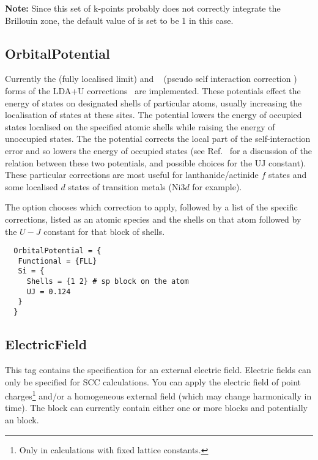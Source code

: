 \textbf{Note:} Since this set of k-points probably does not correctly integrate the Brillouin zone,
the default value of  is set to be 1 in this case.

\subsection{OrbitalPotential}
\label{sec:dftbp.OrbitalPotential}

\label{sec:DFTB+U}

Currently the  (fully localised limit) and
~\cite{hourahine07} (pseudo self interaction correction )
forms of the LDA+U corrections~\cite{petukhov-PRB-67-153106} are
implemented. These potentials effect the energy of states on
designated shells of particular atoms, usually increasing the
localisation of states at these sites. The  potential lowers
the energy of occupied states localised on the specified atomic shells
while raising the energy of unoccupied states. The the 
potential corrects the local part of the self-interaction error and so
lowers the energy of occupied states (see Ref.~\cite{hourahine07} for
a discussion of the relation between these two potentials, and
possible choices for the UJ constant).  These particular corrections
are most useful for lanthanide/actinide $f$ states and some localised
$d$ states of transition metals (Ni$3d$ for example).

The  option chooses which correction to apply, followed
by a list of the specific corrections, listed as an atomic species and
the shells on that atom followed by the $U-J$ constant for that block
of shells.

\begin{verbatim}
  OrbitalPotential = {
   Functional = {FLL}
   Si = {
     Shells = {1 2} # sp block on the atom
     UJ = 0.124
   }
  }
\end{verbatim}

\subsection{ElectricField}
\label{sec:dftbp.ElectricField}

This tag contains the specification for an external electric
field. Electric fields can only be specified for SCC calculations. You
can apply the electric field of point charges\footnote{Only in
  calculations with fixed lattice constants.} and/or a homogeneous
external field (which may change harmonically in time). The
 block can currently contain either one or more
 blocks and potentially an  block.

